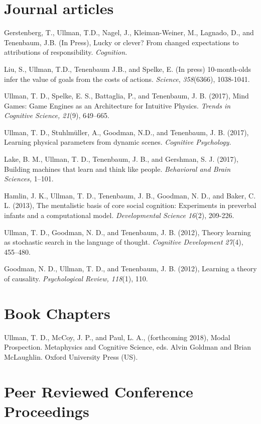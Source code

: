 \documentclass[margin,line,pifont,palatino,courier]{res}
\begin{document}
\begin{resume}
\section{\sc Journal articles}

Gerstenberg, T., Ullman, T.D., Nagel, J., Kleiman-Weiner, M., Lagnado, D., and Tenenbaum, J.B. (In Press), Lucky or clever? From changed expectations to attributions of responsibility. \textit{Cognition.}

Liu, S., Ullman, T.D., Tenenbaum J.B., and Spelke, E. (In press) 10-month-olds infer the value of goals from the costs of actions. \textit{Science}, \textit{358}(6366), 1038-1041.

Ullman, T. D., Spelke, E. S., Battaglia, P., and Tenenbaum, J. B. (2017), Mind Games: Game Engines as an Architecture for Intuitive Physics. \textit{Trends in Cognitive Science, 21}(9), 649--665.

Ullman, T. D., Stuhlm{\"u}ller, A., Goodman, N.D., and Tenenbaum, J. B. (2017), Learning physical parameters from dynamic scenes. \textit{Cognitive Psychology.}

Lake, B. M., Ullman, T. D., Tenenbaum, J. B., and Gershman, S. J. (2017), Building machines that learn and think like people. \textit{Behavioral and Brain Sciences,} 1--101.

Hamlin, J. K., Ullman, T. D., Tenenbaum, J. B., Goodman, N. D., and Baker, C. L. (2013), The mentalistic basis of core social cognition: Experiments in preverbal infants and a computational model. \textit{Developmental Science 16}(2), 209-226.

Ullman, T. D., Goodman, N. D., and Tenenbaum, J. B. (2012), Theory learning as stochastic search in the language of thought. \textit{Cognitive Development 27}(4), 455--480.

Goodman, N. D., Ullman, T. D., and Tenenbaum, J. B. (2012), Learning a theory of causality. \textit{Psychological Review, 118}(1), 110. 

\section{\sc Book Chapters}

Ullman, T. D., McCoy, J. P., and Paul, L. A., (forthcoming 2018), Modal Prospection. Metaphysics and Cognitive Science, eds. Alvin Goldman and Brian McLaughlin. Oxford University Press (US).

\section{\sc Peer Reviewed Conference Proceedings}


\end{resume}
\end{document}
